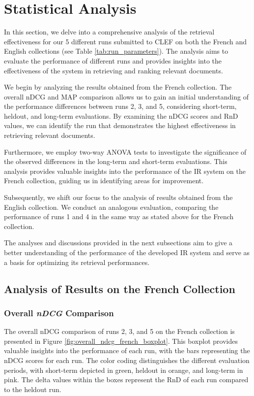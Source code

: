 \section{Statistical Analysis}
\label{sec:analysis}

In this section, we delve into a comprehensive analysis of the retrieval effectiveness for our 5 different runs submitted to \ac{CLEF} on both the French and English collections (see Table \ref{tab:run_parameters}). 
The analysis aims to evaluate the performance of different runs and provides insights into the effectiveness of the system in retrieving and ranking relevant documents.

We begin by analyzing the results obtained from the French collection. 
The overall \ac{nDCG} and \ac{MAP} comparison allows us to gain an initial understanding of the performance differences between runs 2, 3, and 5, considering short-term, heldout, and long-term evaluations. 
By examining the \ac{nDCG} scores and \ac{RnD} values, we can identify the run that demonstrates the highest effectiveness in retrieving relevant documents.

Furthermore, we employ two-way \ac{ANOVA} tests to investigate the significance of the observed differences in the long-term and short-term evaluations. 
This analysis provides valuable insights into the performance of the \ac{IR} system on the French collection, guiding us in identifying areas for improvement.

Subsequently, we shift our focus to the analysis of results obtained from the English collection. 
We conduct an analogous evaluation, comparing the performance of runs 1 and 4 in the same way as stated above for the French collection. 

The analyses and discussions provided in the next subsections aim to give a better understanding of the performance of the developed \ac{IR} system and serve as a basis for optimizing its retrieval performances.


\newpage
\subsection{Analysis of Results on the French Collection}
\enlargethispage{5\baselineskip}
\subsubsection{Overall \textit{nDCG} Comparison}  \label{sec:ndcg_comparison_french}

The overall \ac{nDCG} comparison of runs 2, 3, and 5 on the French collection is presented in Figure \ref{fig:overall_ndcg_french_boxplot}. 
This boxplot provides valuable insights into the performance of each run, with the bars representing the \ac{nDCG} scores for each run. 
The color coding distinguishes the different evaluation periods, with short-term depicted in green, heldout in orange, and long-term in pink. 
The delta values within the boxes represent the \ac{RnD} of each run compared to the heldout run.

